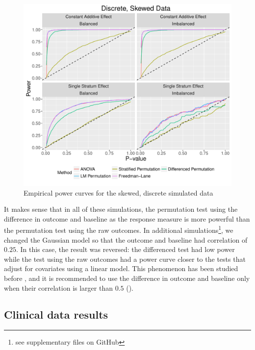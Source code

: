 \documentclass[11pt]{article}
\newcommand{\todo}[1]{{\color{red}{TO DO: \sc #1}}}
\begin{document}
\begin{figure}
\centering
\includegraphics[width = \textwidth]{fig/skewed_simulation_power}
\caption{Empirical power curves for the skewed, discrete simulated data}
\label{fig:skewed_sim_power}
\end{figure}

\begin{center}

\end{center}

It makes sense that in all of these simulations, the permutation test using the difference in outcome and baseline as the response measure is more powerful than the permutation test using the raw outcomes.
In additional simulations\footnote{see supplementary files on GitHub}, we changed the Gaussian model so that the outcome and baseline had correlation of $0.25$.
In this case, the result was reversed: the differenced test had low power while the test using the raw outcomes had a power curve closer to the tests that adjust for covariates using a linear model.
This phenomenon has been studied before \todo{cite}, and it is recommended to use the difference in outcome and baseline only when their correlation is larger than $0.5$ (\cite{frison_repeated_1992}).



\subsection{Clinical data results}
\end{document}
